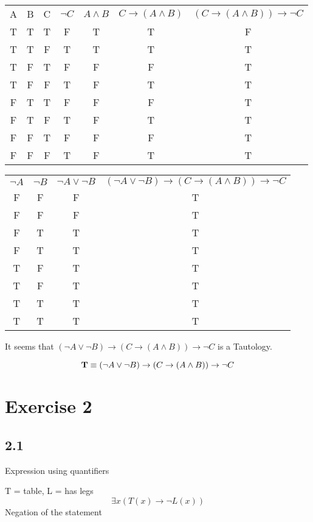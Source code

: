 \documentclass[a4paper,11pt]{article}
\begin{document}
\begin{center}
\begin{tabular}{ |c c c| c | c c | c }
 A & B & C & $\neg C$ & $A \land B$ & $ C \to (A \land B) $ & $ (C \to (A \land B)) \to \neg C $ \\ 
 T & T & T & F & T & T & F \\  
 T & T & F & T & T & T & T \\
 T & F & T & F & F & F & T \\
 T & F & F & T & F & T & T \\
 F & T & T & F & F & F & T \\
 F & T & F & T & F & T & T \\
 F & F & T & F & F & F & T \\
 F & F & F & T & F & T & T \\
\end{tabular}
\end{center}

\begin{center}
\begin{tabular}{ c c c | c }
 $ \neg A $ & $ \neg B $ & $ \neg A \lor \neg B $ & $ (\neg A \lor \neg B) \to (C \to (A \land B)) \to \neg C $ \\ 
 F & F & F & T \\  
 F & F & F & T \\
 F & T & T & T \\
 F & T & T & T \\
 T & F & T & T \\
 T & F & T & T \\
 T & T & T & T \\
 T & T & T & T \\
\end{tabular}
\end{center}

It seems that $ (\neg A \lor \neg B) \to (C \to (A \land B)) \to \neg C $ is a Tautology.

$$ \bold{T} \equiv (\neg A \lor \neg B) \to (C \to (A \land B)) \to \neg C $$

\newpage
\section*{Exercise 2}
\subsection*{2.1}
Expression using quantifiers

T = table, L = has legs
\begin{equation}
    \exists x(T(x) \to \neg L(x))
\end{equation}
Negation of the statement
\end{document}
